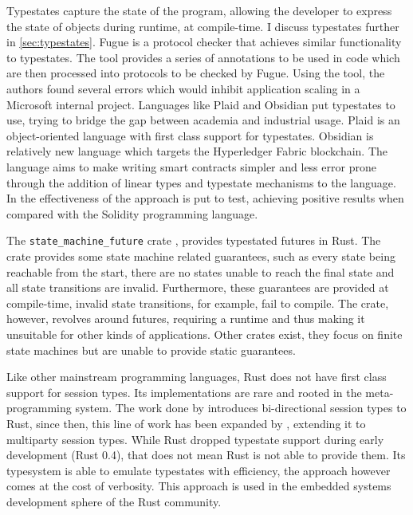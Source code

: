 Typestates capture the state of the program,
allowing the developer to express the state of objects during runtime, at compile-time.
I discuss typestates further in \autoref{sec:typestates}.
Fugue \autocite{DeLine2004} is a protocol checker that achieves similar functionality to typestates.
The tool provides a series of annotations to be used in code which are then processed into protocols to be checked by Fugue.
Using the tool, the authors found several errors which would inhibit application scaling in a Microsoft internal project.
Languages like Plaid \autocite{Aldrich2009} and Obsidian \autocite{Coblenz2020, Coblenz2020a} put typestates to use,
trying to bridge the gap between academia and industrial usage.
Plaid is an object-oriented language with first class support for typestates.
Obsidian is relatively new language which targets the Hyperledger Fabric blockchain.
The language aims to make writing smart contracts simpler and less error prone
through the addition of linear types and typestate mechanisms to the language.
In \autocite{Coblenz2020} the effectiveness of the approach is put to test,
achieving positive results when compared with the Solidity programming language.

The \texttt{state\_machine\_future} crate \autocite{Fitzgerald2019}, provides typestated futures in Rust.
The crate provides some state machine related guarantees, such as every state being reachable from the start,
there are no states unable to reach the final state and all state transitions are invalid.
Furthermore, these guarantees are provided at compile-time, invalid state transitions, for example, fail to compile.
The crate, however, revolves around futures, requiring a runtime and thus making it unsuitable for other kinds of applications.
Other crates exist, they focus on finite state machines but are unable to provide static guarantees.

Like other mainstream programming languages, Rust does not have first class support for session types.
Its implementations are rare and rooted in the meta-programming system.
The work done by \autocite{Jespersen2015, Munksgaard2015} introduces bi-directional session types to Rust,
since then, this line of work has been expanded by \autocite{Lagaillardie2020},
extending it to multiparty session types.
While Rust dropped typestate support during early development (Rust 0.4), that does not mean Rust is not able to provide them.
Its typesystem is able to emulate typestates with efficiency, the approach however comes at the cost of verbosity.
This approach is used in the embedded systems development sphere of the Rust community.


